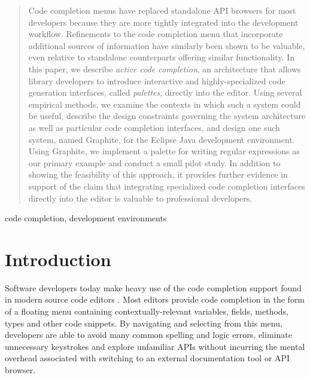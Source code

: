 \documentclass[10pt, conference, compsocconf]{IEEEtran}
\begin{document}
\begin{abstract}
Code completion menus have replaced standalone API browsers for most developers because they are more tightly  integrated into the development workflow. Refinements to the code completion menu that incorporate additional sources of information have similarly been shown to be valuable, even relative to standalone counterparts offering similar functionality. In this paper, we describe {\em active code completion}, an architecture that allows library developers to introduce interactive and highly-specialized code generation interfaces, called {\em palettes}, directly into the editor. Using several empirical methods, we examine the contexts in which such a system could be useful, describe the design constraints governing the system architecture as well as particular code completion interfaces, and design one such system, named Graphite, for the Eclipse Java development environment. Using Graphite, we implement a palette for writing regular expressions as our primary  example and conduct a small pilot study. In addition to showing the feasibility of this approach, it provides further evidence in support of the claim that integrating specialized code completion interfaces directly into the editor is valuable to professional developers.
\end{abstract}

\begin{IEEEkeywords}
code completion, development environments

\end{IEEEkeywords}


%
\IEEEpeerreviewmaketitle
\section{Introduction}
Software developers today make heavy use of the code completion support found in modern source code editors  \cite{murphy_how_2006}. Most editors provide code completion in the form of a floating menu containing  contextually-relevant variables, fields, methods, types and other code snippets. By navigating and selecting from this menu, developers are able to avoid many common spelling and logic errors, eliminate unnecessary keystrokes and explore unfamiliar APIs without incurring the mental overhead associated with switching to an external documentation tool or API browser.
\end{document}
